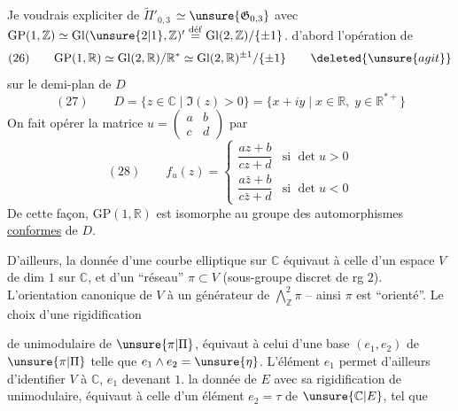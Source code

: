 Je voudrais  expliciter  de
$\widetilde{\Pi}'_{0,3}$
$\simeq\unsure{\mathfrak{G}_{0,3}}$
avec
$\mathrm{GP}(1,\mathbb Z)\simeq\mathrm{Gl}(\unsure{2|1},\mathbb Z)'\mathrel{\mathop{=}\limits^{\mathrm{d\acute{e}f}}}\mathrm{Gl}(2,\mathbb Z)/\{\pm1\}$.
 d'abord l'opération de
\[
(26)\qquad
\mathrm{GP}(1,\mathbb R)\simeq\mathrm{Gl}(2,\mathbb R)/\mathbb R^*
\simeq\mathrm{Gl}(2,\mathbb R)^{\pm1}/\{\pm1\}
\qquad\deleted{\unsure{agit}}
\]
sur le demi-plan de  $D$
\[
(27)\qquad D=\{z\in\mathbb C\mid\Im(z)>0\}
=\{x+iy\mid x\in\mathbb R,\;y\in\mathbb R^{*+}\}
\]
On fait opérer la matrice
$u=\left(\begin{array}{cc}a&b\\c&d\end{array}\right)$ par
\[
(28)\qquad f_u(z)=
\left\{\begin{array}{ll}
\dfrac{az+b}{cz+d}&\text{si }\det u>0\\[6pt]
\dfrac{a\bar z+b}{c\bar z+d}&\text{si }\det u<0
\end{array}\right.
\]
De cette façon, $\mathrm{GP}(1,\mathbb R)$ est isomorphe au groupe des automorphismes
\uline{conformes} de $D$.


D'ailleurs, la donnée d'une courbe elliptique  sur $\mathbb C$
équivaut à celle d'un espace $V$ de dim $1$ sur $\mathbb C$, et d'un
``réseau'' $\pi\subset V$ (sous-groupe discret de rg $2$).
L'orientation canonique de $V$  à un générateur \inserted{$\unsure{\eta}$} de
$\bigwedge_{\mathbb Z}^{2}\pi$ -- ainsi $\pi$ est ``orienté''.
Le choix d'une rigidification



de  unimodulaire de $\unsure{\pi|\Pi}$, équivaut à celui d'une base
$(e_1,e_2)$ de $\unsure{\pi|\Pi}$  telle que
$e_1\wedge e_2=\unsure{\eta}$.
L'élément $e_1$ 
permet d'ailleurs d'identifier $V$ à $\mathbb C$, $e_1$ devenant $1$.
 la donnée de $E$ avec sa rigidification de 
unimodulaire, équivaut à celle d'un élément $e_2=\tau$ de $\unsure{\mathbb C|E}$,
tel que

